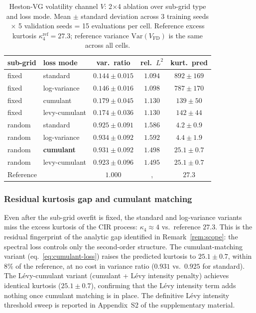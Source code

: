 \documentclass[review,12pt]{elsarticle}
\begin{document}
\begin{table}[h]
\centering
\caption{Heston-VG volatility channel \(V\): 2\(\times\)4 ablation
over sub-grid type and loss mode. Mean \(\pm\) standard deviation
across 3 training seeds \(\times\) 5 validation seeds = 15 evaluations
per cell. Reference excess kurtosis \(\kappa_4^{\mathrm{ref}} = 27.3\);
reference variance \(\mathrm{Var}(V_{\mathrm{FD}})\) is the same
across all cells.}
\label{tab:heston-2x4}
\begin{tabular}{l l c c c}
\toprule
sub-grid & loss mode & var.\ ratio & rel.\ $L^2$ & kurt.\ pred \\
\midrule
fixed & standard   & \(0.144 \pm 0.015\) & \(1.094\) & \(892 \pm 169\) \\
fixed & log-variance & \(0.146 \pm 0.016\) & \(1.098\) & \(787 \pm 170\) \\
fixed & cumulant   & \(0.179 \pm 0.045\) & \(1.130\) & \(139 \pm 50\) \\
fixed & levy-cumulant & \(0.174 \pm 0.036\) & \(1.130\) & \(142 \pm 44\) \\
\midrule
random & standard   & \(0.925 \pm 0.091\) & \(1.586\) & \(4.2 \pm 0.9\) \\
random & log-variance & \(0.934 \pm 0.092\) & \(1.592\) & \(4.4 \pm 1.9\) \\
random & \textbf{cumulant} & \(\mathbf{0.931 \pm 0.092}\) & \(1.498\) & \(\mathbf{25.1 \pm 0.7}\) \\
random & levy-cumulant & \(0.923 \pm 0.096\) & \(1.495\) & \(25.1 \pm 0.7\) \\
\midrule
\multicolumn{2}{l}{Reference} & $1.000$ &, & $27.3$ \\
\bottomrule
\end{tabular}
\end{table}

\subsubsection{Residual kurtosis gap and cumulant matching}

Even after the sub-grid overfit is fixed, the standard and
log-variance variants miss the excess kurtosis of the CIR
process: \(\kappa_4 \approx 4\) vs.\ reference \(27.3\). This
is the residual fingerprint of the analytic gap identified in
Remark~\ref{rem:scope}: the spectral loss controls only the
second-order structure. The cumulant-matching variant
(eq.~\eqref{eq:cumulant-loss}) raises the predicted kurtosis
to \(25.1 \pm 0.7\), within 8\% of the reference, at no cost in
variance ratio (\(0.931\) vs.\ \(0.925\) for standard). The
L\'evy-cumulant variant (cumulant + L\'evy intensity penalty)
achieves identical kurtosis (\(25.1 \pm 0.7\)), confirming that
the L\'evy intensity term adds nothing once cumulant matching
is in place. The definitive L\'evy intensity threshold sweep is
reported in Appendix~S2 of the supplementary material.
\end{document}
